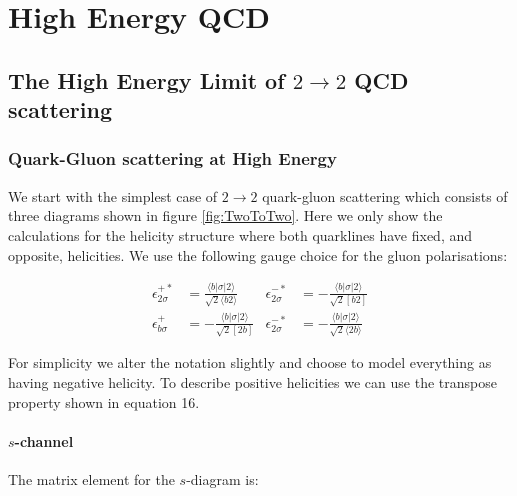 \chapter{High Energy QCD}
\label{chap:HEQCD}

\section{The High Energy Limit of $2\rightarrow2$ QCD scattering}

	\subsection{Quark-Gluon scattering at High Energy}

		We start with the simplest case of $2\rightarrow 2$ quark-gluon scattering which consists of three
		diagrams shown in figure \ref{fig:TwoToTwo}.  Here we only show the calculations for the helicity
		structure where both quarklines have fixed, and opposite, helicities.  We use the following gauge
		choice for the gluon polarisations:

		\begin{align}
		\epsilon^{+*}_{2\sigma}&=\frac{\langle b|\sigma|2\rangle}{\sqrt{2}\langle b2\rangle} & \epsilon^{-*}_{2\sigma} &= -\frac{\langle b|\sigma|2\rangle}{\sqrt{2}[b2]} \\
		\epsilon^{+}_{b\sigma}&=-\frac{\langle b|\sigma|2\rangle}{\sqrt{2}[2b]} & \epsilon^{-*}_{2\sigma} &= -\frac{\langle b|\sigma|2\rangle}{\sqrt{2}\langle 2b\rangle}
		\end{align}

		For simplicity we alter the notation slightly and choose to model everything as having negative helicity.  To describe positive helicities we can use the transpose property shown in equation 16.


		\subsubsection{$s$-channel}

			The matrix element for the $s$-diagram is:

